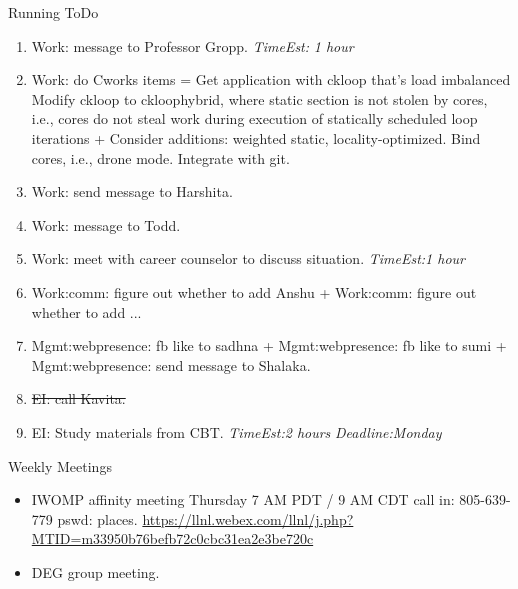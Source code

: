 \documentclass[serif, mathserif, final]{beamer}
\newcommand{\doneTask}[1]{\tiny \item \tiny \sout{#1}}
\newcommand{\te}[1]{\textit{TimeEst:}\textit{#1}}
\newcommand{\dl}[1]{\textit{Deadline:}\textit{#1}}
\begin{document}
\begin{frame}
\begin{columns}
\begin{column}{0.5\linewidth}
  \begin{block}{Running ToDo} %
    \begin{enumerate} 

    \tiny \item \tiny Work: message to Professor Gropp. \te{ 1 hour}

    \item \tiny Work: do Cworks items = Get application with ckloop
      that’s load imbalanced Modify ckloop to
      ckloophybrid, where static section is not stolen by cores, i.e., cores
      do not steal work during execution of statically scheduled loop
      iterations +  Consider additions: weighted static,
      locality-optimized. Bind cores, i.e., drone mode.  Integrate
      with git. 
    \item \tiny Work: send message to Harshita. 

    \item \tiny Work: message to Todd. 

    \item \tiny Work: meet with career counselor to discuss
      situation. \te{1 hour}
      
    \item \tiny Work:comm: figure out whether to add Anshu +
      Work:comm: figure out whether to add ... 
      
    \item \tiny Mgmt:webpresence: fb like to sadhna +
      Mgmt:webpresence: fb like to sumi + Mgmt:webpresence: send
      message to Shalaka. 

    \doneTask{EI: call Kavita.} 
    \item \tiny EI: Study materials from CBT.  \te{2 hours}
      \dl{Monday} 
 
    \end{enumerate}
  \end{block}
 

  \begin{block}{Weekly Meetings}
    \begin{itemize} 
    \item \tiny IWOMP affinity meeting Thursday 7 AM PDT / 9 AM
      CDT call in: 805-639-779 pswd: places. 
      \url{https://llnl.webex.com/llnl/j.php?MTID=m33950b76befb72c0cbc31ea2e3be720c}
    \item \tiny DEG group meeting.  
    \end{itemize}
  \end{block} 
      

\end{column}
\end{columns}
\end{frame}
\end{document}
